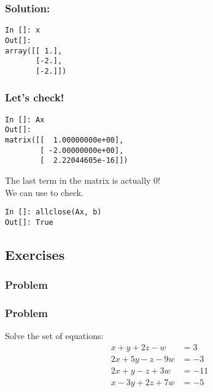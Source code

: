 \documentclass[14pt,compress]{beamer}
\newcommand{\kwrd}[1]{ \texttt{\textbf{\color{blue}{#1}}}  }
\begin{document}
\begin{frame}[fragile]
\frametitle{Solution:}
\begin{lstlisting}
In []: x
Out[]: 
array([[ 1.],
       [-2.],
       [-2.]])
\end{lstlisting}
\end{frame}

\begin{frame}[fragile]
\frametitle{Let's check!}
\begin{lstlisting}
In []: Ax
Out[]: 
matrix([[  1.00000000e+00],
        [ -2.00000000e+00],
        [  2.22044605e-16]])
\end{lstlisting}
\begin{block}{}
The last term in the matrix is actually \alert{0}!\\
We can use \kwrd{allclose()} to check.
\end{block}
\begin{lstlisting}
In []: allclose(Ax, b)
Out[]: True
\end{lstlisting}
\end{frame}

\subsection{Exercises}

\begin{frame}[fragile]
\frametitle{Problem}

\end{frame}

\begin{frame}[fragile]
\frametitle{Problem}
Solve the set of equations:
\begin{align*}
  x + y + 2z -w & = 3\\
  2x + 5y - z - 9w & = -3\\
  2x + y -z + 3w & = -11 \\
  x - 3y + 2z + 7w & = -5\\
\end{align*}
\end{frame}
\end{document}
